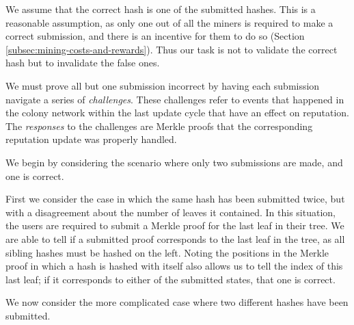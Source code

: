 We assume that the correct hash is one of the  submitted hashes. This is a reasonable assumption, as only one out of all the miners is required to make a correct submission, and there is an incentive for them to do so (Section \ref{subsec:mining-costs-and-rewards}). Thus our task is not to validate the correct hash but to invalidate the false ones.

We must prove all but one submission incorrect by having each submission navigate a series of \emph{challenges}. These challenges refer to events that happened in the colony network within the last update cycle that have an effect on reputation. The \emph{responses} to the challenges are Merkle proofs that the corresponding reputation update was properly handled.

We begin by considering the scenario where only two submissions are made, and one is correct. 

First we consider the case in which the same hash has been submitted twice, but with a disagreement about the number of leaves it contained. In this situation, the users are required to submit a Merkle proof for the last leaf in their tree. We are able to tell if a submitted proof corresponds to the last leaf in the tree, as all sibling hashes must be hashed on the left. Noting the positions in the Merkle proof in which a hash is hashed with itself also allows us to tell the index of this last leaf; if it corresponds to either of the submitted states, that one is correct.

We now consider the more complicated case where two different hashes have been submitted.

